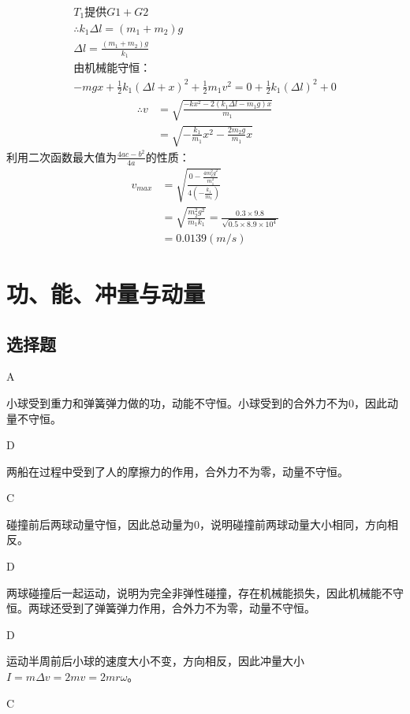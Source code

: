 \documentclass[b5paper,opensource]{qyxf-book}
\begin{document}
\begin{gather*}
T_1\text{提供}G1+G2\\
\therefore k_1\Delta l=(m_1+m_2)g\\
\Delta l=\frac{(m_1+m_2)g}{k_1}\\
\text{由机械能守恒：}\\
-mgx+\frac{1}{2}k_1(\Delta l+x)^2+\frac{1}{2}m_1v^2=0+\frac{1}{2}k_1(\Delta l)^2+0
\end{gather*}
\begin{align*}
\therefore v&=\sqrt{\frac{-kx^2-2(k_1\Delta l-m_1g)x}{m_1}}\\
&=\sqrt{-\frac{k_1}{m_1}x^2-\frac{2m_2g}{m_1}x}
\end{align*}
利用二次函数最大值为$\frac{4ac-b^2}{4a}$的性质：
\begin{align*}
v_{max}	&=\sqrt{\frac{0-\frac{4m_2^2g^2}{m_1^2}}{4\left(-\frac{k_1}{m_1}\right)}}\\
&=\sqrt{\frac{m_2^2g^2}{m_1k_1}}=\frac{0.3\times 9.8}{\sqrt{0.5\times 8.9\times 10^4}}\\
&=0.0139(m/s)
\end{align*}



\chapter{功、能、冲量与动量}
\section{选择题}

A

小球受到重力和弹簧弹力做的功，动能不守恒。小球受到的合外力不为0，因此动量不守恒。

D

两船在过程中受到了人的摩擦力的作用，合外力不为零，动量不守恒。

C

碰撞前后两球动量守恒，因此总动量为0，说明碰撞前两球动量大小相同，方向相反。

D

两球碰撞后一起运动，说明为完全非弹性碰撞，存在机械能损失，因此机械能不守恒。两球还受到了弹簧弹力作用，合外力不为零，动量不守恒。

D

运动半周前后小球的速度大小不变，方向相反，因此冲量大小\(I=m\Delta v=2mv=2mr \omega\)。

C
\end{document}
